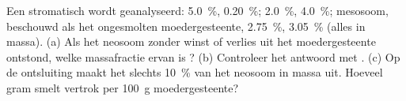 \begin{exercise}[$\star\star\star$]\label{exo:b2:crustal-melting:12}
Een stromatisch  wordt geanalyseerd:   \qty{5.0}{\percent}, 
\qty{0.20}{\percent};   \qty{2.0}{\percent}, 
\qty{4.0}{\percent}; mesosoom, beschouwd als het ongesmolten moedergesteente, 
\qty{2.75}{\percent},  \qty{3.05}{\percent} (alles in massa). (a) Als het
neosoom zonder winst of verlies uit het moedergesteente ontstond, welke massafractie ervan is
? (b) Controleer het antwoord met . (c) Op de ontsluiting maakt het  slechts
\qty{10}{\percent} van het neosoom in massa uit. Hoeveel gram smelt vertrok per
\qty{100}{\gram} moedergesteente?
\end{exercise}

